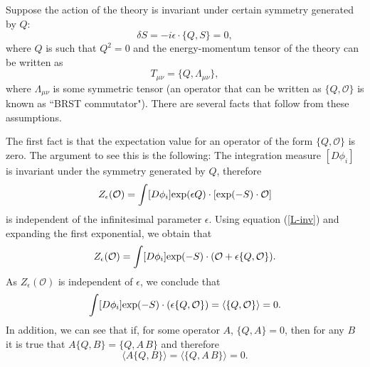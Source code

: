 \documentclass[12pt, onecolumn]{article}
\begin{document}
Suppose the action of the theory is invariant under certain symmetry generated by $Q$:
\begin{equation}
\delta S = -i\epsilon \cdot \{Q,S\}=0, \label{L-inv}
\end{equation}
where $Q$ is such that $Q^2=0$ and the energy-momentum tensor of the theory can be written as
\begin{equation}
T_{\mu \nu} = \{Q,\Lambda_{\mu \nu}\}, \label{T-comm}
\end{equation} where $\Lambda_{\mu \nu}$ is some symmetric tensor (an operator that can be written as $\{Q,\mathcal{O}\}$ is known as ``BRST commutator"). There are several facts that follow from these assumptions.

The first fact is that the expectation value for an operator of the form $\{Q,\mathcal{O}\}$ is zero. The argument to see this is the following: The integration measure $[D\phi_i]$ is invariant under the symmetry generated by $Q$, therefore 
\begin{equation}
Z_{\epsilon}(\mathcal{O})=\int [D\phi_i] {\rm exp}(\epsilon Q)\cdot [{\rm exp}(-S)\cdot\mathcal{O}]
\end{equation} is independent of the infinitesimal parameter $\epsilon$. Using equation (\ref{L-inv}) and expanding the first exponential, we obtain that
\begin{equation}
Z_{\epsilon}(\mathcal{O})=\int [D\phi_i] {\rm exp}(-S)\cdot(\mathcal{O}+\epsilon\{Q,\mathcal{O}\}).
\end{equation}
 As $Z_{\epsilon}(\mathcal{O})$ is independent of $ \epsilon$, we conclude that
\begin{equation}
\int [D\phi_i] {\rm exp}(-S)\cdot(\epsilon\{Q,\mathcal{O}\})=\langle \{Q,\mathcal{O}\} \rangle = 0. \label{vac-1}
\end{equation}
In addition, we can see that if, for some operator $A$, $\{Q,A\}=0$, then for any $B$ it is true that $A\{Q,B\}=\{Q, A\,B\}$ and therefore
\begin{equation}
\langle A \{Q,B\} \rangle = \langle  \{Q,A\,B\} \rangle = 0. \label{col}
\end{equation}
\end{document}
